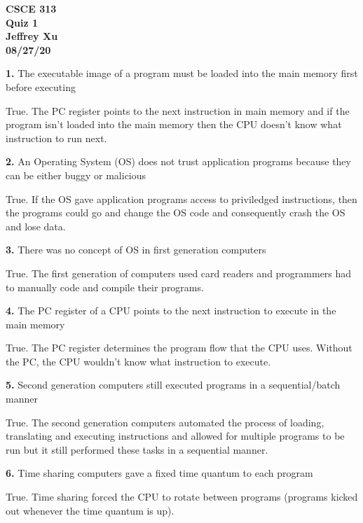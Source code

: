 \documentclass[12pt]{article}
\begin{document}
\begin{center}

{\bf
CSCE 313\\
Quiz 1\\
Jeffrey Xu\\
08/27/20\\
}

\end{center}

{\bf 1.} The executable image of a program must be loaded into the main memory first before
executing

True. The PC register points to the next instruction in main memory and if the program isn't loaded into the main memory then the CPU doesn't know what instruction to run next. 

\bigskip

{\bf 2.} An Operating System (OS) does not trust application programs because they can be either
buggy or malicious

True. If the OS gave application programs access to priviledged instructions, then the programs could go and change the OS code and consequently crash the OS and lose data. 

\bigskip

{\bf 3.} There was no concept of OS in first generation computers

True. The first generation of computers used card readers and programmers had to manually code and compile their programs. 

\bigskip

{\bf 4.} The PC register of a CPU points to the next instruction to execute in the main memory

True. The PC register determines the program flow that the CPU uses. Without the PC, the CPU wouldn't know what instruction to execute. 

\bigskip

{\bf 5.} Second generation computers still executed programs in a sequential/batch manner

True. The second generation computers automated the process of loading, translating and executing instructions and allowed for multiple programs to be run but it still performed these tasks in a sequential manner. 

\bigskip

{\bf 6.} Time sharing computers gave a fixed time quantum to each program

True. Time sharing forced the CPU to rotate between programs (programs kicked out whenever the time quantum is up). 
\end{document}
